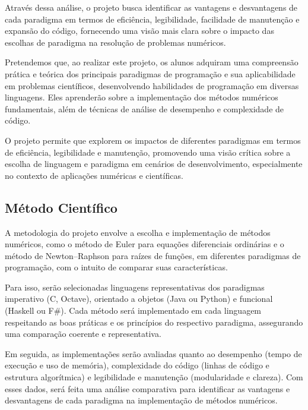 Através dessa análise, o projeto busca identificar as vantagens e desvantagens
de cada paradigma em termos de eficiência, legibilidade, facilidade de
manutenção e expansão do código, fornecendo uma visão mais clara sobre o
impacto das escolhas de paradigma na resolução de problemas numéricos.

Pretendemos que, ao realizar este projeto, os alunos adquiram uma compreensão
prática e teórica dos principais paradigmas de programação e sua aplicabilidade
em problemas científicos, desenvolvendo habilidades de programação em diversas
linguagens. Eles aprenderão sobre a implementação dos métodos numéricos
fundamentais, além de técnicas de análise de desempenho e complexidade de
código.

O projeto permite que explorem os impactos de diferentes paradigmas em termos
de eficiência, legibilidade e manutenção, promovendo uma visão crítica sobre a
escolha de linguagem e paradigma em cenários de desenvolvimento, especialmente
no contexto de aplicações numéricas e científicas.

\subsection{Método Científico}

A metodologia do projeto envolve a escolha e implementação de métodos
numéricos, como o método de Euler para equações diferenciais ordinárias e o
método de Newton--Raphson para raízes de funções, em diferentes paradigmas de
programação, com o intuito de comparar suas características.

Para isso, serão selecionadas linguagens representativas dos paradigmas
imperativo (C, Octave), orientado a objetos (Java ou Python) e funcional
(Haskell ou F\#). Cada método será implementado em cada linguagem respeitando
as boas práticas e os princípios do respectivo paradigma, assegurando uma
comparação coerente e representativa.

Em seguida, as implementações serão avaliadas quanto ao desempenho
(tempo de execução e uso de memória), complexidade do código
(linhas de código e estrutura algorítmica) e legibilidade e manutenção
(modularidade e clareza). Com esses dados, será feita uma análise comparativa
para identificar as vantagens e desvantagens de cada paradigma na implementação
de métodos numéricos.

